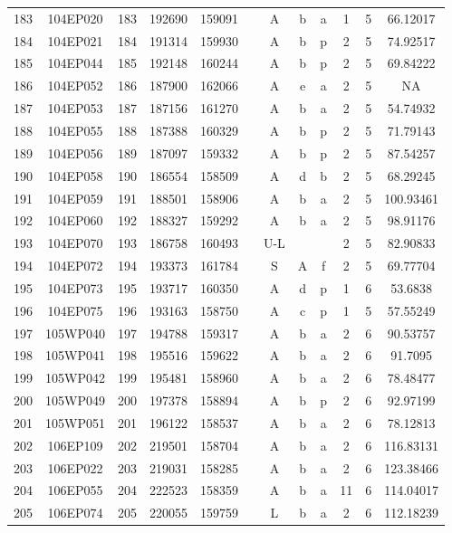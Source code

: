 \begin{tabular}{|*{12}{c|}}
183 & 104EP020 & 183 & 192690 & 159091 &  & A & b & a & 1 & 5 & 66.12017 \\ 
184 & 104EP021 & 184 & 191314 & 159930 &  & A & b & p & 2 & 5 & 74.92517 \\ 
185 & 104EP044 & 185 & 192148 & 160244 &  & A & b & p & 2 & 5 & 69.84222 \\ 
186 & 104EP052 & 186 & 187900 & 162066 &  & A & e & a & 2 & 5 & NA \\ 
187 & 104EP053 & 187 & 187156 & 161270 &  & A & b & a & 2 & 5 & 54.74932 \\ 
188 & 104EP055 & 188 & 187388 & 160329 &  & A & b & p & 2 & 5 & 71.79143 \\ 
189 & 104EP056 & 189 & 187097 & 159332 &  & A & b & p & 2 & 5 & 87.54257 \\ 
190 & 104EP058 & 190 & 186554 & 158509 &  & A & d & b & 2 & 5 & 68.29245 \\ 
191 & 104EP059 & 191 & 188501 & 158906 &  & A & b & a & 2 & 5 & 100.93461 \\ 
192 & 104EP060 & 192 & 188327 & 159292 &  & A & b & a & 2 & 5 & 98.91176 \\ 
193 & 104EP070 & 193 & 186758 & 160493 &  & U-L &  &  & 2 & 5 & 82.90833 \\ 
194 & 104EP072 & 194 & 193373 & 161784 &  & S & A & f & 2 & 5 & 69.77704 \\ 
195 & 104EP073 & 195 & 193717 & 160350 &  & A & d & p & 1 & 6 & 53.6838 \\ 
196 & 104EP075 & 196 & 193163 & 158750 &  & A & c & p & 1 & 5 & 57.55249 \\ 
197 & 105WP040 & 197 & 194788 & 159317 &  & A & b & a & 2 & 6 & 90.53757 \\ 
198 & 105WP041 & 198 & 195516 & 159622 &  & A & b & a & 2 & 6 & 91.7095 \\ 
199 & 105WP042 & 199 & 195481 & 158960 &  & A & b & a & 2 & 6 & 78.48477 \\ 
200 & 105WP049 & 200 & 197378 & 158894 &  & A & b & p & 2 & 6 & 92.97199 \\ 
201 & 105WP051 & 201 & 196122 & 158537 &  & A & b & a & 2 & 6 & 78.12813 \\ 
202 & 106EP109 & 202 & 219501 & 158704 &  & A & b & a & 2 & 6 & 116.83131 \\ 
203 & 106EP022 & 203 & 219031 & 158285 &  & A & b & a & 2 & 6 & 123.38466 \\ 
204 & 106EP055 & 204 & 222523 & 158359 &  & A & b & a & 11 & 6 & 114.04017 \\ 
205 & 106EP074 & 205 & 220055 & 159759 &  & L & b & a & 2 & 6 & 112.18239 \\ 

\end{tabular}
